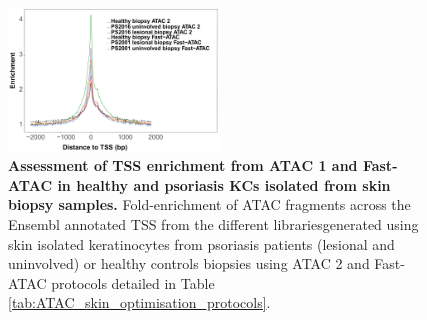 \begin{figure}[htbp]
\centering
\includegraphics[width=0.5\textwidth]{./Appendix/pdfs/Chapter3/ATAC_skin_biopsy_samples_all_methods_TSS_enrichment_supplementary}
\caption[Assessment of TSS enrichment from ATAC 1 and Fast-ATAC in healthy and psoriasis KCs isolated from skin biopsy samples.]{\textbf{Assessment of TSS enrichment from ATAC 1 and Fast-ATAC in healthy and psoriasis KCs isolated from skin biopsy samples.} Fold-enrichment of ATAC fragments across the Ensembl annotated TSS from the different librariesgenerated using skin isolated keratinocytes from psoriasis patients (lesional and uninvolved) or healthy controls biopsies using ATAC 2 and Fast-ATAC protocols detailed in Table \ref{tab:ATAC_skin_optimisation_protocols}.}
\label{figure:TSS_skin_biopsies}
\end{figure}



